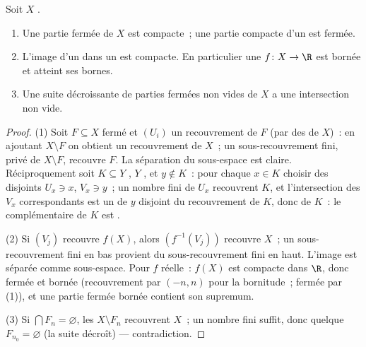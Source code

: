 \begin{theorem}\label{thm:b3:topology:compactprops}
Soit $X$ .
\begin{enumerate}
  \item Une partie fermée de $X$ est compacte~; une partie
        compacte d'un  est fermée.
  \item L'image  d'un  dans un  est compacte. En particulier une $f\colon X
        \to \R$  est bornée et atteint ses bornes.
  \item Une suite décroissante de parties fermées non vides de
        $X$ a une intersection non vide.
\end{enumerate}
\end{theorem}

\begin{proof}
(1) Soit $F \subseteq X$ fermé et $(U_i)$ un recouvrement
 de $F$ (par des  de $X$)~: en ajoutant $X
\setminus F$ on obtient un recouvrement  de $X$~; un
sous-recouvrement fini, privé de $X \setminus F$, recouvre
$F$. La séparation du sous-espace est claire. Réciproquement
soit $K \subseteq Y$ , $Y$ , et $y \notin K$~:
pour chaque $x \in K$ choisir des  disjoints $U_x \ni
x$, $V_x \ni y$~; un nombre fini de $U_x$ recouvrent $K$, et
l'intersection des $V_x$ correspondants est un  de
$y$ disjoint du recouvrement de $K$, donc de $K$~: le
complémentaire de $K$ est .

(2) Si $(V_j)$ recouvre $f(X)$, alors $(f^{-1}(V_j))$ recouvre
$X$~; un sous-recouvrement fini en bas provient du
sous-recouvrement fini en haut. L'image est séparée comme
sous-espace. Pour $f$ réelle~: $f(X)$ est compacte dans $\R$,
donc fermée et bornée (recouvrement par $(-n, n)$ pour la
bornitude~; fermée par (1)), et une partie fermée bornée
contient son supremum.

(3) Si $\bigcap F_n = \varnothing$, les  $X \setminus
F_n$ recouvrent $X$~; un nombre fini suffit, donc quelque
$F_{n_0} = \varnothing$ (la suite décroît) --- contradiction.
\end{proof}

